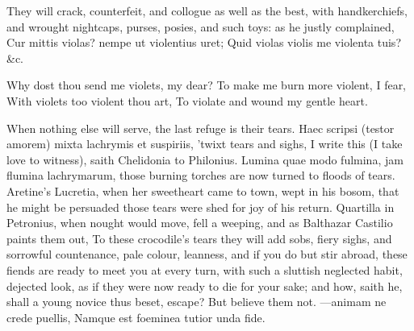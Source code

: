 {They will crack, counterfeit, and collogue as well as the best,
with handkerchiefs, and wrought nightcaps, purses, posies, and such
toys: as he justly complained,
Cur mittis violas? nempe ut violentius uret;
Quid violas violis me violenta tuis? \&c.

Why dost thou send me violets, my dear?
To make me burn more violent, I fear,
With violets too violent thou art,
To violate and wound my gentle heart.

When nothing else will serve, the last refuge is their tears. Haec
scripsi (testor amorem) mixta lachrymis et suspiriis, 'twixt tears and
sighs, I write this (I take love to witness), saith Chelidonia to
Philonius. Lumina quae modo fulmina, jam flumina lachrymarum, those
burning torches are now turned to floods of tears. Aretine's Lucretia,
when her sweetheart came to town, wept in his bosom, that he
might be persuaded those tears were shed for joy of his return.
Quartilla in Petronius, when nought would move, fell a weeping, and as
Balthazar Castilio paints them out, To these crocodile's tears
they will add sobs, fiery sighs, and sorrowful countenance, pale
colour, leanness, and if you do but stir abroad, these fiends are ready
to meet you at every turn, with such a sluttish neglected habit,
dejected look, as if they were now ready to die for your sake; and how,
saith he, shall a young novice thus beset, escape? But believe them
not.
---animam ne crede puellis,
Namque est foeminea tutior unda fide.

}
